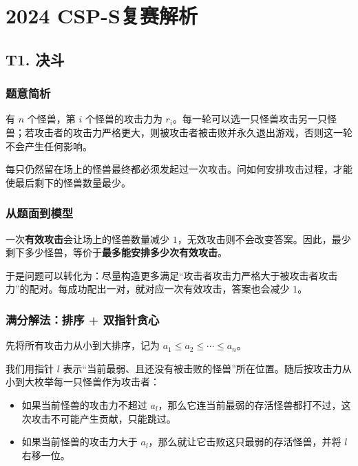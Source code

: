 \documentclass{book}
\begin{document}
\chapter{2024 CSP-S复赛解析}
\newpage

    \section{T1. 决斗} %
    
    
    \subsection{题意简析}

    有 $n$ 个怪兽，第 $i$ 个怪兽的攻击力为 $r_i$。每一轮可以选一只怪兽攻击另一只怪兽；若攻击者的攻击力严格更大，则被攻击者被击败并永久退出游戏，否则这一轮不会产生任何影响。

    每只仍然留在场上的怪兽最终都必须发起过一次攻击。问如何安排攻击过程，才能使最后剩下的怪兽数量最少。

    
    \subsection{从题面到模型}

    一次\textbf{有效攻击}会让场上的怪兽数量减少 $1$，无效攻击则不会改变答案。因此，最少剩下多少怪兽，等价于\textbf{最多能安排多少次有效攻击}。

    于是问题可以转化为：尽量构造更多满足“攻击者攻击力严格大于被攻击者攻击力”的配对。每成功配出一对，就对应一次有效攻击，答案也会减少 $1$。

    
    \subsection{满分解法：排序 + 双指针贪心}

    先将所有攻击力从小到大排序，记为 $a_1\le a_2\le \cdots \le a_n$。

    我们用指针 $l$ 表示“当前最弱、且还没有被击败的怪兽”所在位置。随后按攻击力从小到大枚举每一只怪兽作为攻击者：

    \begin{itemize}[leftmargin=2em,itemsep=1pt,topsep=2pt,parsep=0pt,partopsep=0pt]
        \item 如果当前怪兽的攻击力不超过 $a_l$，那么它连当前最弱的存活怪兽都打不过，这次攻击不可能产生贡献，只能跳过。
        \item 如果当前怪兽的攻击力大于 $a_l$，那么就让它击败这只最弱的存活怪兽，并将 $l$ 右移一位。
    \end{itemize}
\end{document}

